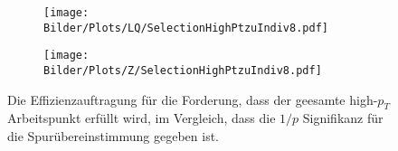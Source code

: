 \begin{figure}
  \begin{subfigure}[t]{0.55\textwidth}
  \texttt{[image: Bilder/Plots/LQ/SelectionHighPtzuIndiv8.pdf]}
  \label{SelectionHighPtzuIndiv8LQ}
  \end{subfigure}
\begin{subfigure}[t]{0.55\textwidth}
 \texttt{[image: Bilder/Plots/Z/SelectionHighPtzuIndiv8.pdf]}
  \label{SelectionHighPtzuIndiv8Z}
\end{subfigure}
\caption{Die Effizienzauftragung für die Forderung, dass der geesamte high-$p_T$ Arbeitspunkt erfüllt wird, im Vergleich, dass die $1/p$ Signifikanz für die Spurübereinstimmung gegeben ist.}
\label{SelectionHighPtzuIndiv8}
\end{figure}
%

